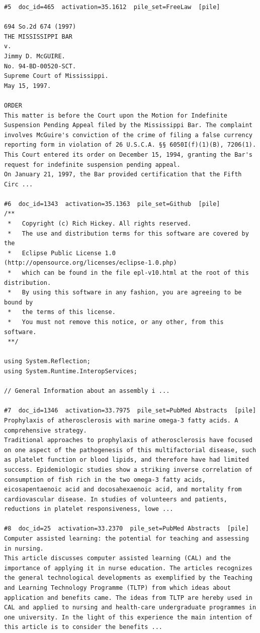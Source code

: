 \begin{verbatim}
#5  doc_id=465  activation=35.1612  pile_set=FreeLaw  [pile]

694 So.2d 674 (1997)
THE MISSISSIPPI BAR
v.
Jimmy D. McGUIRE.
No. 94-BD-00520-SCT.
Supreme Court of Mississippi.
May 15, 1997.

ORDER
This matter is before the Court upon the Motion for Indefinite Suspension Pending Appeal filed by the Mississippi Bar. The complaint involves McGuire's conviction of the crime of filing a false currency reporting form in violation of 26 U.S.C.A. §§ 6050I(f)(1)(B), 7206(1). This Court entered its order on December 15, 1994, granting the Bar's request for indefinite suspension pending appeal.
On January 21, 1997, the Bar provided certification that the Fifth Circ ...

#6  doc_id=1343  activation=35.1363  pile_set=Github  [pile]
﻿/**
 *   Copyright (c) Rich Hickey. All rights reserved.
 *   The use and distribution terms for this software are covered by the
 *   Eclipse Public License 1.0 (http://opensource.org/licenses/eclipse-1.0.php)
 *   which can be found in the file epl-v10.html at the root of this distribution.
 *   By using this software in any fashion, you are agreeing to be bound by
 * 	 the terms of this license.
 *   You must not remove this notice, or any other, from this software.
 **/

using System.Reflection;
using System.Runtime.InteropServices;

// General Information about an assembly i ...

#7  doc_id=1346  activation=33.7975  pile_set=PubMed Abstracts  [pile]
Prophylaxis of atherosclerosis with marine omega-3 fatty acids. A comprehensive strategy.
Traditional approaches to prophylaxis of atherosclerosis have focused on one aspect of the pathogenesis of this multifactorial disease, such as platelet function or blood lipids, and therefore have had limited success. Epidemiologic studies show a striking inverse correlation of consumption of fish rich in the two omega-3 fatty acids, eicosapentaenoic acid and docosahexaenoic acid, and mortality from cardiovascular disease. In studies of volunteers and patients, reductions in platelet responsiveness, lowe ...

#8  doc_id=25  activation=33.2370  pile_set=PubMed Abstracts  [pile]
Computer assisted learning: the potential for teaching and assessing in nursing.
This article discusses computer assisted learning (CAL) and the importance of applying it in nurse education. The articles recognizes the general technological developments as exemplified by the Teaching and Learning Technology Programme (TLTP) from which ideas about application and benefits came. The ideas from TLTP are hereby used in CAL and applied to nursing and health-care undergraduate programmes in one university. In the light of this experience the main intention of this article is to consider the benefits ...


\end{verbatim}
